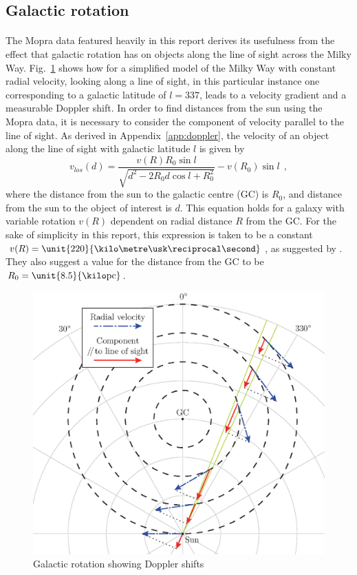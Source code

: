 \documentclass[a4paper, titlepage, oneside]{article}
\newcommand{\parsec}{\mathrm{pc}}
\begin{document}
\begin{multicols}{2}
\subsection{Galactic rotation}
\label{sec:gal-rot}
\paragraph{}
The Mopra data featured heavily in this report \parencite{Burton:2013} derives its usefulness from the effect that galactic rotation has on objects along the line of sight across the Milky Way. Fig.~\ref{fig:gal-rot} shows how for a simplified model of the Milky Way with constant radial velocity, looking along a line of sight, in this particular instance one corresponding to a galactic latitude of \(l=337\), leads to a velocity gradient and a measurable Doppler shift. In order to find distances from the sun using the Mopra data, it is necessary to consider the component of velocity parallel to the line of sight. As derived in Appendix~\ref{app:doppler}, the velocity of an object along the line of sight with galactic latitude \(l\) is given by
\begin{equation}
  v_{los}(d)=\frac{v(R)R_0\sin{l}}{\sqrt{d^2-2R_0d\cos{l}+R_0^2}}-v(R_0)\sin{l}\;\,,
\end{equation}
where the distance from the sun to the galactic centre (GC) is \(R_0\), and distance from the sun to the object of interest is \(d\). This equation holds for a galaxy with variable rotation \(v(R)\) dependent on radial distance \(R\) from the GC. For the sake of simplicity in this report, this expression is taken to be a constant \(v(R)=\unit{220}{\kilo\metre\usk\reciprocal\second}\), as suggested by \textcite{Kerr:1986}. They also suggest a value for the distance from the GC to be \(R_0=\unit{8.5}{\kilo\parsec}\).

\begin{figure}[H]
  \centering
  \includegraphics[width = \columnwidth]{figures/galactic-rotation}
  \caption{Galactic rotation showing Doppler shifts}
  \label{fig:gal-rot}
\end{figure}


\end{multicols}
\end{document}
